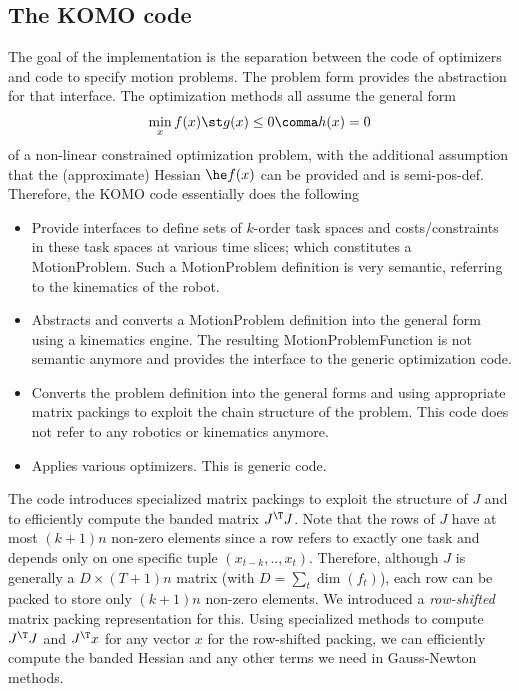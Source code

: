 \documentclass[10pt,fleqn,twoside]{article}
\begin{document}
\subsection{The KOMO code}

The goal of the implementation is the separation between the code of
optimizers and code to specify motion problems. The problem
form  provides the abstraction for that interface. The
optimization methods all assume the general form
\begin{align}\label{eqOpt}
\min_x f(x) \st g(x)\le 0 \comma h(x) = 0
\end{align}
of a non-linear constrained optimization problem, with the additional
assumption that the (approximate) Hessian $\he f(x)$ can be provided
and is semi-pos-def. Therefore, the KOMO code essentially does the
following
\begin{itemize}
\item Provide interfaces to define sets of $k$-order task spaces and
costs/constraints in these task spaces at various time slices; which
constitutes a MotionProblem. Such a MotionProblem definition is very
semantic, referring to the kinematics of the robot.
\item Abstracts and converts a MotionProblem definition into the general
form  using a kinematics engine. The resulting
MotionProblemFunction is not semantic anymore and provides the
interface to the generic optimization code.
\item Converts the problem definition  into the general
forms  and  using appropriate matrix packings
to exploit the chain structure of the problem. This code does not
refer to any robotics or kinematics anymore.
\item Applies various optimizers. This is generic code.
\end{itemize}

The code introduces specialized matrix packings to exploit the
structure of $J$ and to efficiently compute the banded matrix $J^\T
J$. Note that the rows of $J$ have at most $(k+1)n$ non-zero elements
since a row refers to exactly one task and depends only on one
specific tuple $(x_{t-k},..,x_t)$. Therefore, although $J$ is
generally a $D\times (T+1)n$ matrix (with $D=\sum_t \dim(f_t)$),
each row can be packed to store only $(k+1)n$ non-zero elements. We
introduced a \emph{row-shifted} matrix packing representation for
this. Using specialized methods to compute $J^\T J$ and $J^\T x$ for
any vector $x$ for the row-shifted packing, we can efficiently compute
the banded Hessian and any other terms we need in Gauss-Newton
methods.
\end{document}
